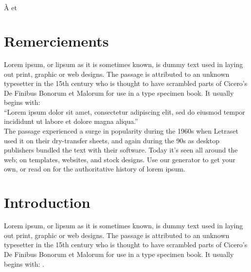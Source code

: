 
\chapter*{}

\thispagestyle{empty}
\vspace{5cm}
\begin{flushright}
	À  et 
\end{flushright}





\frontmatter

\chapter*{Remerciements}

Lorem ipsum, or lipsum as it is sometimes known, is dummy text used in laying out print, graphic or web designs. The passage is attributed to an unknown typesetter in the 15th century who is thought to have scrambled parts of Cicero's De Finibus Bonorum et Malorum for use in a type specimen book. It usually begins with:\\

“Lorem ipsum dolor sit amet, consectetur adipiscing elit, sed do eiusmod tempor incididunt ut labore et dolore magna aliqua.”\\


The passage experienced a surge in popularity during the 1960s when Letraset used it on their dry-transfer sheets, and again during the 90s as desktop publishers bundled the text with their software. Today it's seen all around the web; on templates, websites, and stock designs. Use our generator to get your own, or read on for the authoritative history of lorem ipsum.
\begin{flushright}
\end{flushright}

\chapter*{Introduction}
Lorem ipsum, or lipsum as it is sometimes known, is dummy text used in laying out print, graphic or web designs. The passage is attributed to an unknown typesetter in the 15th century who is thought to have scrambled parts of Cicero's De Finibus Bonorum et Malorum for use in a type specimen book. It usually begins with: .\\ 

